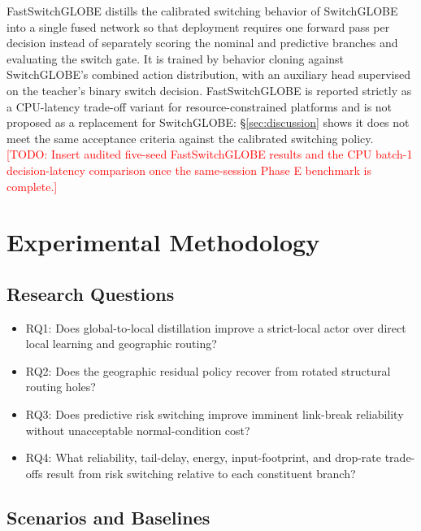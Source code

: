 \documentclass[preprint,12pt]{elsarticle}
\newcommand{\method}{SwitchGLOBE}
\newcommand{\fastmethod}{FastSwitchGLOBE}
\newcommand{\todo}[1]{\textcolor{red}{[TODO: #1]}}
\begin{document}
\fastmethod{} distills the calibrated switching behavior of \method{} into a single fused network so that deployment requires one forward pass per decision instead of separately scoring the nominal and predictive branches and evaluating the switch gate. It is trained by behavior cloning against \method{}'s combined action distribution, with an auxiliary head supervised on the teacher's binary switch decision. \fastmethod{} is reported strictly as a CPU-latency trade-off variant for resource-constrained platforms and is not proposed as a replacement for \method{}: \S\ref{sec:discussion} shows it does not meet the same acceptance criteria against the calibrated switching policy. \todo{Insert audited five-seed FastSwitchGLOBE results and the CPU batch-1 decision-latency comparison once the same-session Phase E benchmark is complete.}

\section{Experimental Methodology}

\subsection{Research Questions}

\begin{itemize}[leftmargin=*]
    \item RQ1: Does global-to-local distillation improve a strict-local actor over direct local learning and geographic routing?
    \item RQ2: Does the geographic residual policy recover from rotated structural routing holes?
    \item RQ3: Does predictive risk switching improve imminent link-break reliability without unacceptable normal-condition cost?
    \item RQ4: What reliability, tail-delay, energy, input-footprint, and drop-rate trade-offs result from risk switching relative to each constituent branch?
\end{itemize}

\subsection{Scenarios and Baselines}
\end{document}
